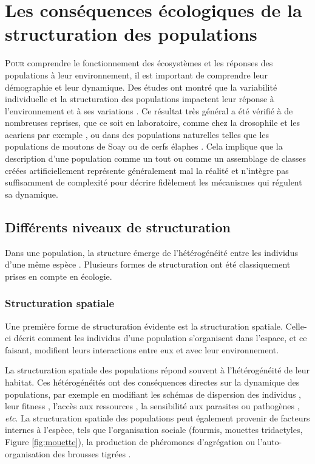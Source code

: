\section{Les conséquences écologiques de la
structuration des populations}

\lettrine[lines=3]{P}{our} comprendre le fonctionnement des écosystèmes et les
réponses des populations à leur environnement, il est important de comprendre
leur démographie et leur dynamique. Des études ont montré que la variabilité
individuelle et la structuration des populations impactent leur réponse à
l'environnement et à ses variations \autocites{benton2005a}.
Ce résultat très général a été vérifié à de nombreuses reprises, que ce soit en
laboratoire, comme chez la drosophile \autocites{madalena1974a} et les acariens
par exemple \autocites{benton2005a}, ou dans des populations naturelles telles
que les populations de moutons de Soay \autocites{coulson2001a,ozgul2009a} ou de
cerfs élaphes \autocites{langvatn1999a}.
Cela implique que la description d'une population comme un tout ou comme un
assemblage de classes créées artificiellement représente généralement mal la
réalité et n'intègre pas suffisamment de complexité pour décrire fidèlement les
mécanismes qui régulent sa dynamique.

\subsection{Différents niveaux de structuration}

Dans une population, la structure émerge de l'hétérogénéité entre les
individus d'une même espèce \autocites{benton2006a}. Plusieurs formes de
structuration ont été classiquement prises en compte en écologie.

\subsubsection{Structuration spatiale}

Une première forme de structuration évidente est la structuration spatiale.
Celle-ci décrit comment les individus d'une population s'organisent dans
l'espace, et ce faisant, modifient leurs interactions entre eux et avec leur environnement. 

La structuration spatiale des populations répond souvent à l'hétérogénéité de
leur habitat. Ces hétérogénéités ont des conséquences directes sur la dynamique
des populations, par exemple en modifiant les schémas de dispersion des
individus \autocites{hiebeler2000a}, leur fitness \autocites[valeur adaptative
ou sélective,][]{zajkac2008a}, l'accès aux ressources \autocites{burger2008a},
la sensibilité aux parasites ou pathogènes \autocites{su2009a}, \textit{etc}. La
structuration spatiale des populations peut également provenir de facteurs
internes à l'espèce, tels que l'organisation sociale (fourmis, mouettes
tridactyles, Figure \ref{fig:mouette}), la production de phéromones d'agrégation
\autocites[Collemboles,][]{joosse1974aggregational,manica2001aggregation} ou
l'auto-organisation des brousses tigrées \autocites[Figure
\ref{fig:mouette}][]{deblauwe2008global}.

